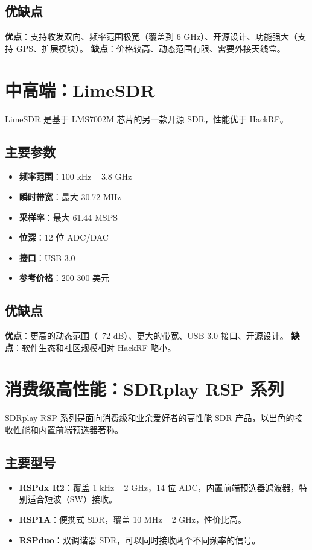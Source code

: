 \documentclass[12pt,UTF8]{ctexbook}
\begin{document}
\subsection{优缺点}
\textbf{优点}：支持收发双向、频率范围极宽（覆盖到 6 GHz）、开源设计、功能强大（支持 GPS、扩展模块）。
\textbf{缺点}：价格较高、动态范围有限、需要外接天线盒。

\section{中高端：LimeSDR}
\label{sec:limesdr_detail}

LimeSDR 是基于 LMS7002M 芯片的另一款开源 SDR，性能优于 HackRF。

\subsection{主要参数}
\begin{itemize}[leftmargin=2cm]
    \item \textbf{频率范围}：100 kHz ~ 3.8 GHz
    \item \textbf{瞬时带宽}：最大 30.72 MHz
    \item \textbf{采样率}：最大 61.44 MSPS
    \item \textbf{位深}：12 位 ADC/DAC
    \item \textbf{接口}：USB 3.0
    \item \textbf{参考价格}：200-300 美元
\end{itemize}

\subsection{优缺点}
\textbf{优点}：更高的动态范围（~72 dB）、更大的带宽、USB 3.0 接口、开源设计。
\textbf{缺点}：软件生态和社区规模相对 HackRF 略小。

\section{消费级高性能：SDRplay RSP 系列}
\label{sec:sdrplay}

SDRplay RSP 系列是面向消费级和业余爱好者的高性能 SDR 产品，以出色的接收性能和内置前端预选器著称。

\subsection{主要型号}
\begin{itemize}[leftmargin=2cm]
    \item \textbf{RSPdx R2}：覆盖 1 kHz ~ 2 GHz，14 位 ADC，内置前端预选器滤波器，特别适合短波（SW）接收。
    \item \textbf{RSP1A}：便携式 SDR，覆盖 10 MHz ~ 2 GHz，性价比高。
    \item \textbf{RSPduo}：双调谐器 SDR，可以同时接收两个不同频率的信号。
\end{itemize}
\end{document}
